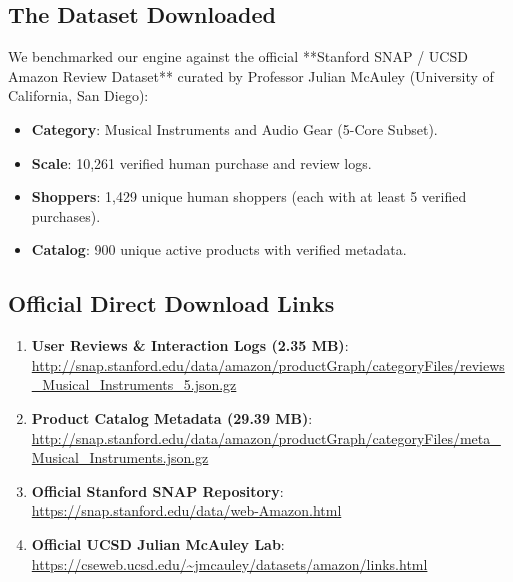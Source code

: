 \documentclass[11pt,a4paper]{article}
\begin{document}
\subsection{The Dataset Downloaded}
We benchmarked our engine against the official **Stanford SNAP / UCSD Amazon Review Dataset** curated by Professor Julian McAuley (University of California, San Diego):
\begin{itemize}[noitemsep]
    \item \textbf{Category}: Musical Instruments and Audio Gear (5-Core Subset).
    \item \textbf{Scale}: 10,261 verified human purchase and review logs.
    \item \textbf{Shoppers}: 1,429 unique human shoppers (each with at least 5 verified purchases).
    \item \textbf{Catalog}: 900 unique active products with verified metadata.
\end{itemize}

\subsection{Official Direct Download Links}
\begin{enumerate}
    \item \textbf{User Reviews \& Interaction Logs (2.35 MB)}:\\
    \url{http://snap.stanford.edu/data/amazon/productGraph/categoryFiles/reviews_Musical_Instruments_5.json.gz}
    \item \textbf{Product Catalog Metadata (29.39 MB)}:\\
    \url{http://snap.stanford.edu/data/amazon/productGraph/categoryFiles/meta_Musical_Instruments.json.gz}
    \item \textbf{Official Stanford SNAP Repository}:\\
    \url{https://snap.stanford.edu/data/web-Amazon.html}
    \item \textbf{Official UCSD Julian McAuley Lab}:\\
    \url{https://cseweb.ucsd.edu/~jmcauley/datasets/amazon/links.html}
\end{enumerate}
\end{document}
